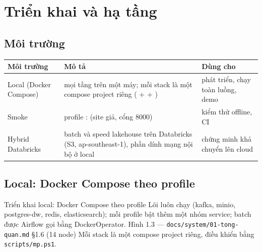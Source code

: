 \chapter{Triển khai và hạ tầng}\label{chap:deploy}

\section{Môi trường}
\begin{xltabular}{\linewidth}{@{}L{30mm}Y L{44mm}@{}}
  \toprule
  \textbf{Môi trường} & \textbf{Mô tả} & \textbf{Dùng cho} \\
  \midrule
  Local (Docker Compose) & mọi tầng trên một máy; mỗi stack là một compose project riêng ( +  + ) & phát triển, chạy toàn luồng, demo \\
  Smoke & profile :  (site giả, cổng 8000) & kiểm thử offline, CI \\
  Hybrid Databricks & batch và speed lakehouse trên Databricks (S3, ap-southeast-1), phần dính mạng nội bộ ở local & chứng minh khả chuyển lên cloud \\
  \bottomrule
\end{xltabular}

\section{Local: Docker Compose theo profile}
  {Triển khai local: Docker Compose theo profile}
  {Lõi luôn chạy (kafka, minio, postgres-dw, redis, elasticsearch); mỗi profile bật thêm một nhóm service; batch được Airflow gọi bằng DockerOperator.}
  {Hình 1.3 — \texttt{docs/system/01-tong-quan.md} §1.6 (14 node)}
  {Mỗi stack là một compose project riêng, điều khiển bằng \texttt{scripts/mp.ps1}.}

